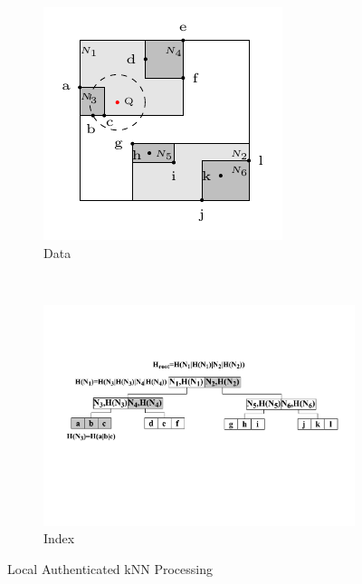 \begin{figure}[t]
  \centering
  \begin{subfigure}[b]{.35\linewidth}
    \centering
    \includegraphics[width=\linewidth]{figs/knn/local-mrtree-data.pdf}
    \caption{Data}\label{fig:knn:local-mrtree:data}
  \end{subfigure}~%
  \begin{subfigure}[b]{.65\linewidth}
    \centering
    \includegraphics[width=\linewidth]{figs/knn/local-mrtree-tree.pdf}
    \caption{Index}\label{fig:knn:local-mrtree:tree}
  \end{subfigure}
  \caption{Local Authenticated {kNN} Processing}\label{fig:knn:local-mrtree}
\end{figure}

